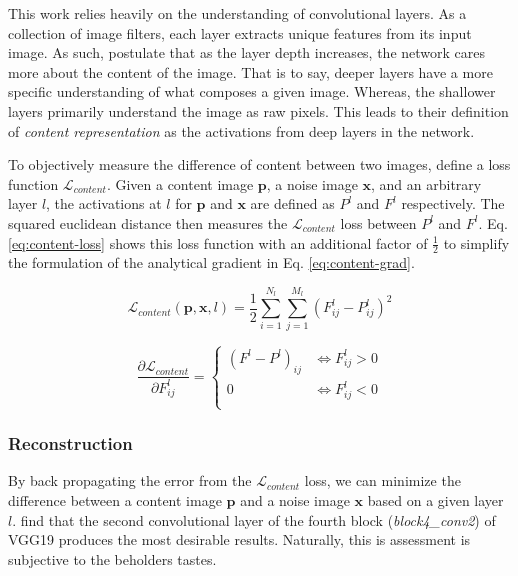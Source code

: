 \documentclass{article}
\begin{document}
This work relies heavily on the understanding of convolutional layers. As a
collection of image filters, each layer extracts unique features from its
input image. As such, \cite{2015arXiv150806576G} postulate that as the layer
depth increases, the network cares more about the content of the image. That
is to say, deeper layers have a more specific understanding of what composes
a given image. Whereas, the shallower layers primarily understand the image
as raw pixels. This leads to their definition of \textit{content
representation} as the activations from deep layers in the network.

To objectively measure the difference of content between two images,
\cite{2015arXiv150806576G} define a loss function $\mathcal{L}_{content}$.
Given a content image $\textbf{p}$, a noise image $\textbf{x}$, and an
arbitrary layer $l$, the activations at $l$ for $\textbf{p}$ and $\textbf{x}$
are defined as $P^l$ and $F^l$ respectively. The squared euclidean distance
then measures the $\mathcal{L}_{content}$ loss between $P^l$ and $F^l$. Eq.
\ref{eq:content-loss} shows this loss function with an additional factor of
$\frac{1}{2}$ to simplify the formulation of the analytical gradient in Eq.
\ref{eq:content-grad}.

\begin{equation}
\label{eq:content-loss}
\mathcal{L}_{content}(\mathbf{p}, \mathbf{x}, l) =
\frac{1}{2} \sum_{i=1}^{N_l}\sum_{j=1}^{M_l}{(F^l_{ij} - P^l_{ij})^2}
\end{equation}

\begin{equation}
\label{eq:content-grad}
\frac{\partial \mathcal{L}_{content}}{\partial F^l_{ij}} =
\begin{cases}
    (F^l - P^l)_{ij} & \iff F^l_{ij} > 0 \\
    0 & \iff F^l_{ij} < 0 \\
\end{cases}
\end{equation}

\subsubsection{Reconstruction}

By back propagating the error from the $\mathcal{L}_{content}$ loss, we can
minimize the difference between a content image $\textbf{p}$ and a noise image
$\textbf{x}$ based on a given layer $l$. \cite{2015arXiv150806576G} find that
the second convolutional layer of the fourth block (\textit{block4\_conv2}) of
VGG19 produces the most desirable results.
Naturally, this is assessment is subjective to the beholders tastes.
\end{document}
